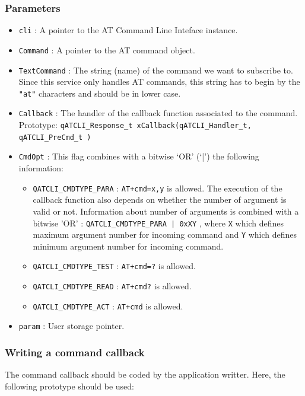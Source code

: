 \documentclass{article}
\begin{document}
\subsubsection*{Parameters}
\begin{itemize}
    \item \lstinline{cli} : A pointer to the AT Command Line Inteface instance. 
    \item \lstinline{Command} :  A pointer to the AT command object.
    \item \lstinline{TextCommand} : The string (name) of the command we want to subscribe to. Since this service only handles AT commands, this string has to begin by the \lstinline{"at"} characters and should be in lower case.
    \item \lstinline{Callback} : The handler of the callback function associated to the command. Prototype: 
    \lstinline{qATCLI_Response_t xCallback(qATCLI_Handler_t, qATCLI_PreCmd_t )}
    \item \lstinline{CmdOpt} : This flag combines with a bitwise ‘OR’ (‘|’) the following information:
    \begin{itemize}
        \item \lstinline{QATCLI_CMDTYPE_PARA} : \lstinline{AT+cmd=x,y} is allowed. The execution of the callback function also depends on whether the number of argument is valid or not. Information about number of arguments is combined with a bitwise 'OR' : \lstinline{QATCLI_CMDTYPE_PARA | 0xXY} , where \lstinline{X} which defines maximum argument number for incoming command and \lstinline{Y} which defines minimum argument number for incoming command.
        \item \lstinline{QATCLI_CMDTYPE_TEST} : \lstinline{AT+cmd=?} is allowed. 
        \item \lstinline{QATCLI_CMDTYPE_READ} : \lstinline{AT+cmd?} is allowed. 
        \item \lstinline{QATCLI_CMDTYPE_ACT} : \lstinline{AT+cmd} is allowed. 
    \end{itemize}
    \item \lstinline{param} :  User storage pointer.
\end{itemize}

\subsubsection{Writing a command callback}
The command callback should be coded by the application writter. Here, the following prototype should be used: \\
\end{document}
